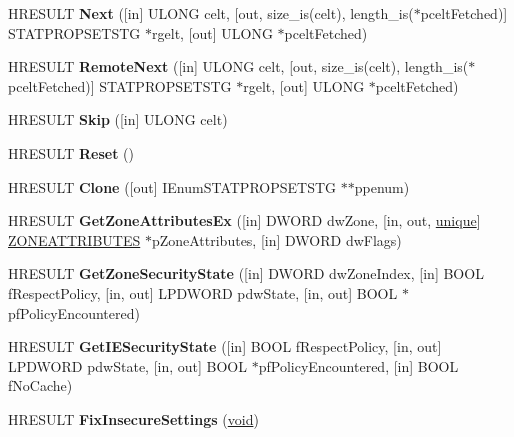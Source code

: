 \begin{DoxyCompactItemize}
H\+R\+E\+S\+U\+LT {\bfseries Next} (\mbox{[}in\mbox{]} U\+L\+O\+NG celt, \mbox{[}out, size\+\_\+is(celt), length\+\_\+is($\ast$pcelt\+Fetched)\mbox{]} S\+T\+A\+T\+P\+R\+O\+P\+S\+E\+T\+S\+TG $\ast$rgelt, \mbox{[}out\mbox{]} U\+L\+O\+NG $\ast$pcelt\+Fetched)
\item 
\mbox{\label{interfacestruct_a5cb4391d5bf99491d3849a3c17989b76}} 
H\+R\+E\+S\+U\+LT {\bfseries Remote\+Next} (\mbox{[}in\mbox{]} U\+L\+O\+NG celt, \mbox{[}out, size\+\_\+is(celt), length\+\_\+is($\ast$pcelt\+Fetched)\mbox{]} S\+T\+A\+T\+P\+R\+O\+P\+S\+E\+T\+S\+TG $\ast$rgelt, \mbox{[}out\mbox{]} U\+L\+O\+NG $\ast$pcelt\+Fetched)
\item 
\mbox{\label{interfacestruct_a146b9cbfedb8c62ad65b067e56881fef}} 
H\+R\+E\+S\+U\+LT {\bfseries Skip} (\mbox{[}in\mbox{]} U\+L\+O\+NG celt)
\item 
\mbox{\label{interfacestruct_a84c08d68e88d6008b6c3dccab2a56572}} 
H\+R\+E\+S\+U\+LT {\bfseries Reset} ()
\item 
\mbox{\label{interfacestruct_af0d0b4bd8644620474c0662bc326d70f}} 
H\+R\+E\+S\+U\+LT {\bfseries Clone} (\mbox{[}out\mbox{]} I\+Enum\+S\+T\+A\+T\+P\+R\+O\+P\+S\+E\+T\+S\+TG $\ast$$\ast$ppenum)
\item 
\mbox{\label{interfacestruct_ae108c5a056603502fc519dc7ca671647}} 
H\+R\+E\+S\+U\+LT {\bfseries Get\+Zone\+Attributes\+Ex} (\mbox{[}in\mbox{]} D\+W\+O\+RD dw\+Zone, \mbox{[}in, out, \hyperlink{interfaceunique}{unique}\mbox{]} \hyperlink{struct_i_internet_zone_manager_1_1___z_o_n_e_a_t_t_r_i_b_u_t_e_s}{Z\+O\+N\+E\+A\+T\+T\+R\+I\+B\+U\+T\+ES} $\ast$p\+Zone\+Attributes, \mbox{[}in\mbox{]} D\+W\+O\+RD dw\+Flags)
\item 
\mbox{\label{interfacestruct_ad8db36f1c698b289ba5cb3421b09951a}} 
H\+R\+E\+S\+U\+LT {\bfseries Get\+Zone\+Security\+State} (\mbox{[}in\mbox{]} D\+W\+O\+RD dw\+Zone\+Index, \mbox{[}in\mbox{]} B\+O\+OL f\+Respect\+Policy, \mbox{[}in, out\mbox{]} L\+P\+D\+W\+O\+RD pdw\+State, \mbox{[}in, out\mbox{]} B\+O\+OL $\ast$pf\+Policy\+Encountered)
\item 
\mbox{\label{interfacestruct_a3f5c0112c9a3220fdc508014c83660cf}} 
H\+R\+E\+S\+U\+LT {\bfseries Get\+I\+E\+Security\+State} (\mbox{[}in\mbox{]} B\+O\+OL f\+Respect\+Policy, \mbox{[}in, out\mbox{]} L\+P\+D\+W\+O\+RD pdw\+State, \mbox{[}in, out\mbox{]} B\+O\+OL $\ast$pf\+Policy\+Encountered, \mbox{[}in\mbox{]} B\+O\+OL f\+No\+Cache)
\item 
\mbox{\label{interfacestruct_a020f1077782923895f7f7899874bd50f}} 
H\+R\+E\+S\+U\+LT {\bfseries Fix\+Insecure\+Settings} (\hyperlink{interfacevoid}{void})
\end{DoxyCompactItemize}


